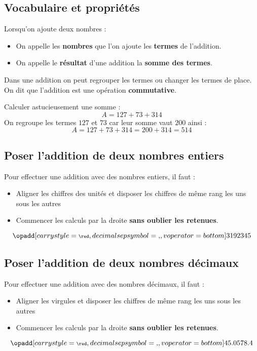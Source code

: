 \documentclass[a4paper,dvipsnames]{article}
\begin{document}
\subsection{Vocabulaire et propriétés}

\begin{Def}
Lorsqu'on ajoute deux nombres :
\begin{itemize}
\item On appelle les \textbf{nombres} que l'on ajoute les \textbf{termes} de l'addition.
\item On appelle le \textbf{résultat} d'une addition la \textbf{somme des termes}.
\end{itemize}
\end{Def}

\begin{Prop}
Dans une addition on peut regrouper les termes ou changer les termes de place. On dit que l'addition est une opération \textbf{commutative}.
\end{Prop}

\begin{Mt}
Calculer astucieusement une somme :
\[A=127+73+314\]
On regroupe les termes $127$ et $73$ car leur somme vaut $200$ ainsi :
\[A=127+73+314=200+314=514\]
\end{Mt}

\subsection{Poser l'addition de deux nombres entiers}

\begin{Mt}
Pour effectuer une addition avec des nombres entiers, il faut :
\begin{itemize}
    \item Aligner les chiffres des unités et disposer les chiffres de même rang les uns sous les autres
    \item Commencer les calculs par la droite \textbf{sans oublier les retenues}.
\end{itemize}
\bigskip
\[\opadd[carrystyle=\scriptsize\red,
decimalsepsymbol={,},
voperator=bottom]{3192}{345}\]
\end{Mt} 

\subsection{Poser l'addition de deux nombres décimaux}

\begin{Mt}
Pour effectuer une addition avec des nombres décimaux, il faut :
\begin{itemize}
    \item Aligner les virgules et disposer les chiffres de même rang les uns sous les autres
    \item Commencer les calculs par la droite \textbf{sans oublier les retenues}.
\end{itemize}
\bigskip
\[\opadd[carrystyle=\scriptsize\red,
decimalsepsymbol={,},
voperator=bottom]{45.05}{78.4}\]
\end{Mt} 
\end{document}
